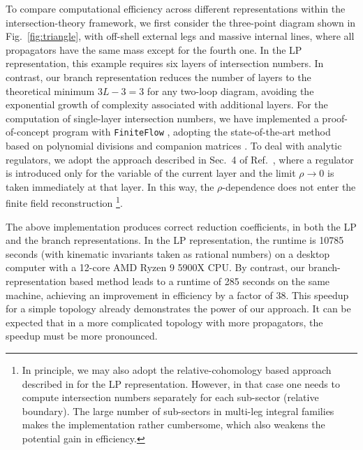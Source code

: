 \documentclass[reprint,superscriptaddress]{revtex4-2}
\begin{document}
To compare computational efficiency across different representations within the intersection-theory framework, we first consider the three-point diagram shown in Fig.~\ref{fig:triangle}, with off-shell external legs and massive internal lines, where all propagators have the same mass except for the fourth one. In the LP representation, this example requires six layers of intersection numbers. In contrast, our branch representation reduces the number of layers to the theoretical minimum $3L-3 = 3$ for any two-loop diagram, avoiding the exponential growth of complexity associated with additional layers. For the computation of single-layer intersection numbers, we have implemented a proof-of-concept program with \texttt{FiniteFlow} \cite{Peraro:2019svx}, adopting the state-of-the-art method based on polynomial divisions and companion matrices \cite{Fontana:2023amt, Brunello:2023rpq, Brunello:2024tqf}. To deal with analytic regulators, we adopt the approach described in Sec.~4 of Ref.~\cite{Fontana:2023amt}, where a regulator is introduced only for the variable of the current layer and the limit $\rho\to 0$ is taken immediately at that layer. In this way, the $\rho$-dependence does not enter the finite field reconstruction \footnote{In principle, we may also adopt the relative-cohomology based approach described in \cite{Lu:2024dsb} for the LP representation. However, in that case one needs to compute intersection numbers separately for each sub-sector (relative boundary). The large number of sub-sectors in multi-leg integral families makes the implementation rather cumbersome, which also weakens the potential gain in efficiency.}.

The above implementation produces correct reduction coefficients, in both the LP and the branch representations. In the LP representation, the runtime is 10785 seconds (with kinematic invariants taken as rational numbers) on a desktop computer with a 12-core AMD Ryzen 9 5900X CPU. By contrast, our branch-representation based method leads to a runtime of 285 seconds on the same machine, achieving an improvement in efficiency by a factor of 38. This speedup for a simple topology already demonstrates the power of our approach. It can be expected that in a more complicated topology with more propagators, the speedup must be more pronounced.
\end{document}
